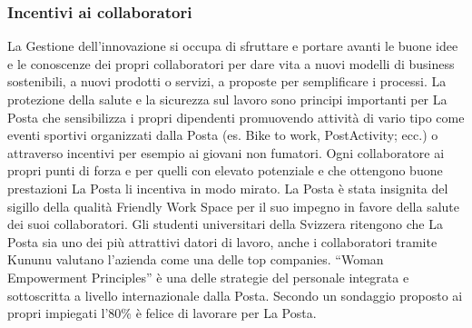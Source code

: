 \subsubsection{Incentivi ai collaboratori}
La Gestione dell’innovazione si occupa di sfruttare e portare avanti le buone idee e le conoscenze dei propri collaboratori per dare vita a nuovi modelli di business sostenibili, a nuovi prodotti o servizi, a proposte per semplificare i processi.
La protezione della salute e la sicurezza sul lavoro sono principi importanti per La Posta che sensibilizza i propri dipendenti promuovendo attività di vario tipo come eventi sportivi organizzati dalla Posta (es. Bike to work, PostActivity; ecc.) o attraverso incentivi per esempio ai giovani non fumatori.
Ogni collaboratore ai propri punti di forza e per quelli con elevato potenziale e che ottengono buone prestazioni La Posta li incentiva in modo mirato.
La Posta è stata insignita del sigillo della qualità Friendly Work Space per il suo impegno in favore della salute dei suoi collaboratori.
Gli studenti universitari della Svizzera ritengono che La Posta sia uno dei più attrattivi datori di lavoro, anche i collaboratori tramite Kununu valutano l’azienda come una delle top companies.
“Woman Empowerment Principles” è una delle strategie del personale integrata e sottoscritta a livello internazionale dalla Posta.
Secondo un sondaggio proposto ai propri impiegati l’80\% è felice di lavorare per La Posta.


